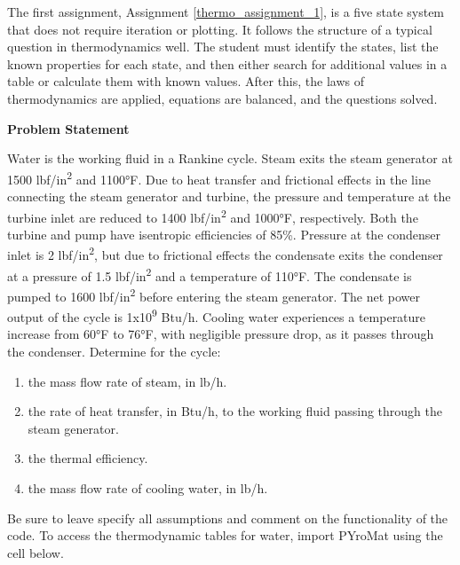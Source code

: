 The first assignment, Assignment \ref{thermo_assignment_1}, is a five state system that does not require 
iteration or plotting. It follows the structure of a typical question in thermodynamics well. The student 
must identify the states, list the known properties for each state, and then either search for additional 
values in a table or calculate them with known values. After this, the laws of thermodynamics are applied, 
equations are balanced, and the questions solved.

\label{thermo_assignment_1}

\begin{tcolorbox}[breakable, enhanced jigsaw, title=ME 513: Assignment \ref{thermo_assignment_1}, 
    colframe=ksu-purple, colback=ksu-gray]

    \textbf{Problem Statement}

    Water is the working fluid in a Rankine cycle. Steam exits the steam generator at 1500 
    lbf/in\textsuperscript{2}  and 1100°F. Due to heat transfer and frictional effects in 
    the line connecting the steam generator and turbine, the pressure and temperature at the 
    turbine inlet are reduced to 1400 lbf/in\textsuperscript{2} and 1000°F, respectively. Both the 
    turbine and pump have isentropic efficiencies of 85\%. Pressure at the condenser inlet 
    is 2 lbf/in\textsuperscript{2}, but due to frictional effects the condensate exits the 
    condenser at a pressure of 1.5 lbf/in\textsuperscript{2} and a temperature of 110°F. The 
    condensate is pumped to 1600 lbf/in\textsuperscript{2} before entering the steam generator. 
    The net power output of the cycle is 1x10\textsuperscript{9} Btu/h. Cooling water experiences 
    a temperature increase from 60°F to 76°F, with negligible pressure drop, as it passes 
    through the condenser. Determine for the cycle:

    \begin{enumerate}
        \item the mass flow rate of steam, in lb/h.
        \item the rate of heat transfer, in Btu/h, to the working fluid passing through the steam 
        generator. 
        \item the thermal efficiency.
        \item the mass flow rate of cooling water, in lb/h.
    \end{enumerate}

    Be sure to leave specify all assumptions and comment on the functionality of the code. 
    To access the thermodynamic tables for water, import PYroMat using the cell below.


\end{tcolorbox}
